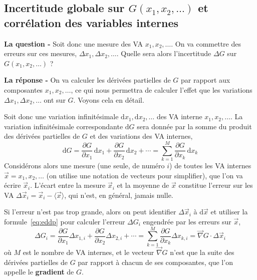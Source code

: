 \documentclass[main.tex]{subfiles}
\begin{document}
\subsection{Incertitude globale sur $G(x_1,x_2,\dots)$ et corrélation des variables internes}

\textbf{La question -} Soit donc une mesure des VA $x_1,x_2,\dots$. On va commettre des erreurs sur ces mesures, $\Delta x_1,\Delta x_2,\dots$. Quelle sera alors l'incertitude $\Delta G$ sur $G(x_1,x_2,\dots)$ ?

\textbf{La réponse -} On va calculer les dérivées partielles de $G$ par rapport aux composantes $x_1,x_2,\dots$, ce qui nous permettra de calculer l'effet que les variations $\Delta x_1,\Delta x_2,\dots$ ont sur $G$. Voyons cela en détail.

Soit donc une variation infinitésimale $\text{d}x_1,\text{d}x_2,\dots$ des VA interne $x_1,x_2,\dots$. La variation infinitésimale correspondante $\text{d}G$ sera donnée par la somme du produit des dérivées partielles de $G$ et des variations des VA internes,
\begin{equation}
    \text{d} G=\frac{\partial G}{\partial x_1}\,\text{d} x_{1}
    +\frac{\partial G}{\partial x_2}\,\text{d} x_{2}+\cdots
    =\sum\limits_{k=1}^{M}\frac{\partial G}{\partial x_k}\,\text{d} x_{k}
    \label{eq:eddp}
\end{equation}
Considérons alors une mesure (une seule, de numéro $i$) de toutes les VA internes $\vec{x}=x_1,x_2,\dots$ (on utilise une notation de vecteurs pour simplifier), que l'on va écrire $\vec{x}_i$. L'écart entre la mesure $\vec{x}_i$ et la moyenne de $\vec{x}$ constitue l'erreur sur les VA $\Delta\vec{x}_i=\vec{x}_i-\langle\vec{x}\rangle$, qui n'est, en général, jamais nulle.

Si l'erreur n'est pas trop grande, alors on peut identifier $\Delta\vec{x}_i$ à $\text{d}\vec{x}$ et utiliser la formule~\ref{eq:eddp} pour calculer l'erreur $\Delta G_i$ engendrée par les erreurs sur $\vec{x}$,
\begin{equation}
    \Delta G_i=\frac{\partial G}{\partial x_1}\Delta x_{1,i}
    +\frac{\partial G}{\partial x_2}\Delta x_{2,i}+\cdots
    =\sum\limits_{k=1}^{M}\frac{\partial G}{\partial x_k}\Delta x_{k,i}=\vec{\nabla} G\cdot\Delta\vec{x}_i
\end{equation}
où $M$ est le nombre de VA internes, et le vecteur $\vec{\nabla} G$ n'est que la suite des dérivées partielles de $G$ par rapport à chacun de ses composantes, que l'on appelle le \textbf{gradient} de $G$.
\end{document}
